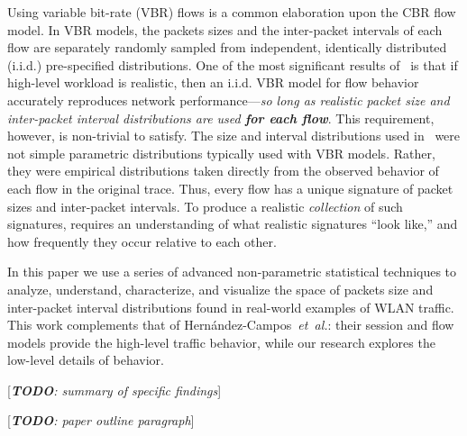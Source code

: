 \documentclass[conference]{IEEEtran}
\newcommand{\caps}[1]{{\small{#1}}}
\newcommand{\todo}[1]{[\textit{\textbf{TODO}: {#1}}]}
\begin{document}
Using variable bit-rate (\caps{VBR}) flows is a common elaboration upon the \caps{CBR} flow model. In \caps{VBR} models, the packets sizes and the inter-packet intervals of each flow are separately randomly sampled from independent, identically distributed (i.i.d.) pre-specified distributions.
One of the most significant results of~\cite{Karpinski07:realism} is that if high-level workload is realistic, then an i.i.d. \caps{VBR} model for flow behavior accurately reproduces network performance---\textit{so long as realistic packet size and inter-packet interval distributions are used \textbf{for each flow}}. This requirement, however, is non-trivial to satisfy. The size and interval distributions used in~\cite{Karpinski07:realism} were not simple parametric distributions typically used with \caps{VBR} models. Rather, they were empirical distributions taken directly from the observed behavior of each flow in the original trace. Thus, every flow has a unique signature of packet sizes and inter-packet intervals. To produce a realistic \textit{collection} of such signatures, requires an understanding of what realistic signatures ``look like,'' and how frequently they occur relative to each other.

In this paper we use a series of advanced non-parametric statistical techniques
to analyze, understand, characterize, and visualize the space of packets size and inter-packet interval distributions found in real-world examples of \caps{WLAN} traffic. This work complements that of Hern\'andez-Campos~\textit{et~al.}: their session and flow models provide the high-level traffic behavior, while our research explores the low-level details of behavior.%

\todo{summary of specific findings}

\todo{paper outline paragraph}

\end{document}
